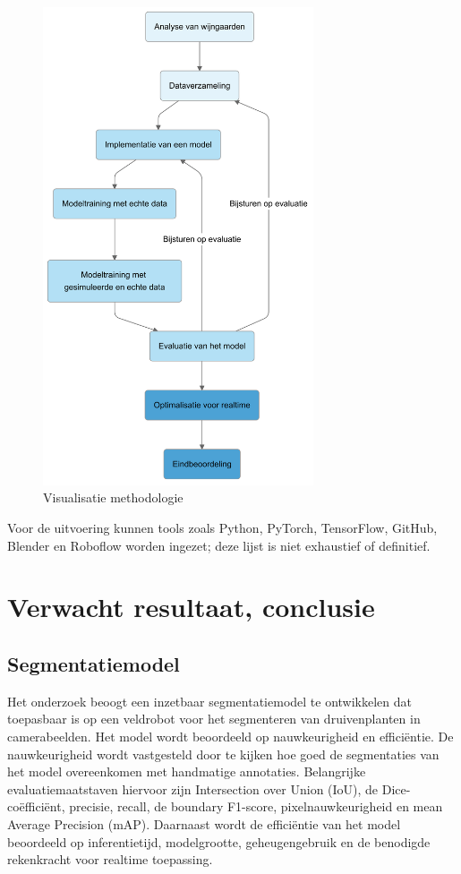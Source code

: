 \begin{figure}[h]
    \includegraphics[width=8cm]{img/verloop.png}
    \caption{Visualisatie methodologie}
    \label{fig:met}
\end{figure}

Voor de uitvoering kunnen tools zoals Python, PyTorch, TensorFlow, GitHub, Blender en Roboflow worden ingezet; deze lijst is niet exhaustief of definitief.

\section{Verwacht resultaat, conclusie}%
\label{sec:verwachte_resultaten}

\subsection{Segmentatiemodel}
Het onderzoek beoogt een inzetbaar segmentatiemodel te ontwikkelen dat toepasbaar is op een veldrobot voor het segmenteren van druivenplanten in camerabeelden. Het model wordt beoordeeld op nauwkeurigheid en efficiëntie. De nauwkeurigheid wordt vastgesteld door te kijken hoe goed de segmentaties van het model overeenkomen met handmatige annotaties. Belangrijke evaluatiemaatstaven hiervoor zijn Intersection over Union (IoU), de Dice-coëfficiënt, precisie, recall, de boundary F1-score, pixelnauwkeurigheid en mean Average Precision (mAP). Daarnaast wordt de efficiëntie van het model beoordeeld op inferentietijd, modelgrootte, geheugengebruik en de benodigde rekenkracht voor realtime toepassing.

